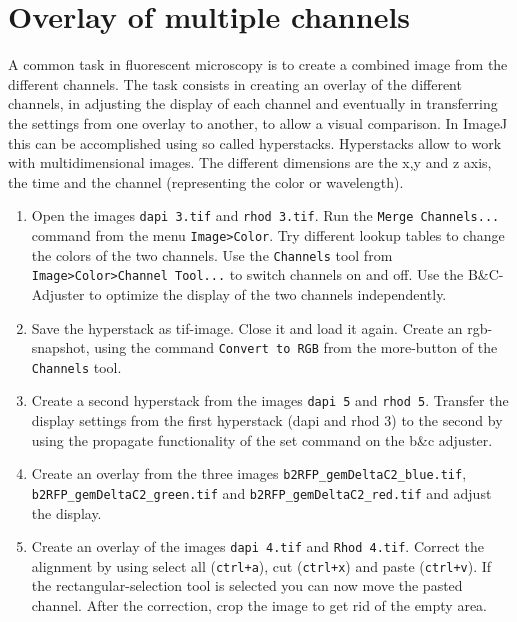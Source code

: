 \section{Overlay of multiple channels}

A common task in fluorescent microscopy is to create a combined image from the different channels. The task consists in creating an overlay of the different channels, in adjusting the display of each channel and eventually in transferring the settings from one overlay to another, to allow a visual comparison. In ImageJ this can be accomplished using so called hyperstacks. Hyperstacks allow to work with multidimensional images. The different dimensions are the x,y and z axis, the time and the channel (representing the color or wavelength).

\begin{enumerate}

\item Open the images \texttt{dapi 3.tif} and \texttt{rhod 3.tif}. Run the \texttt{Merge Channels...} command from the menu \texttt{Image>Color}. Try different lookup tables to change the colors of the two channels. Use the \texttt{Channels} tool from \texttt{Image>Color>Channel Tool...} to switch channels on and off. Use the B\&C-Adjuster to optimize the display of the two channels independently.

\item Save the hyperstack as tif-image. Close it and load it again. Create an rgb-snapshot, using
the command \texttt{Convert to RGB} from the more-button of the \texttt{Channels} tool.

\item Create a second hyperstack from the images \texttt{dapi 5} and \texttt{rhod 5}. Transfer the display settings from the first hyperstack (dapi and rhod 3) to the second by using the propagate functionality of the set command on the b\&c adjuster.

\item Create an overlay from the three images \texttt{b2RFP\_gemDeltaC2\_blue.tif}, \texttt{b2RFP\_gemDeltaC2\_green.tif} and \texttt{b2RFP\_gemDeltaC2\_red.tif} and adjust the display.

\item Create an overlay of the images \texttt{dapi 4.tif} and \texttt{Rhod 4.tif}. Correct the alignment by using select all (\texttt{ctrl+a}), cut (\texttt{ctrl+x}) and paste (\texttt{ctrl+v}). If the rectangular-selection tool is selected you can now move the pasted channel. After the correction, crop the image to get rid of the empty area.


\end{enumerate}
